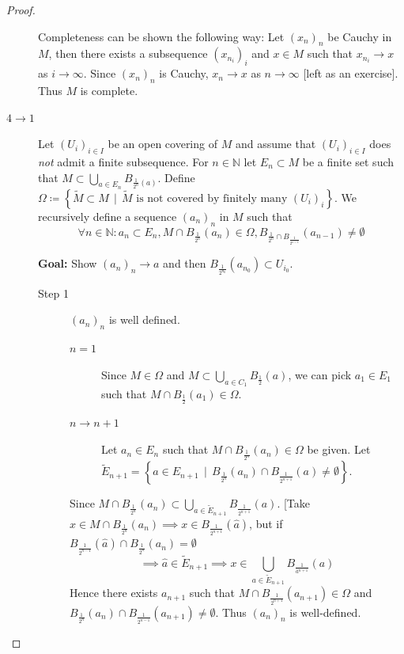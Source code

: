 \documentclass[a4paper]{article}
\numberwithin{lecref}{section}
\newcommand{\SetDef}[2]{\left\{#1\,\mid\,#2\right\}}
\begin{document}
\begin{proof}
\begin{description}
			Completeness can be shown the following way:
			Let $(x_n)_n$ be Cauchy in $M$, then there exists a subsequence $(x_{n_i})_i$ and $x \in M$ such that $x_{n_i} \to x$ as $i \to \infty$.
			Since $(x_n)_n$ is Cauchy, $x_n \to x$ as $n \to \infty$ [left as an exercise]. Thus $M$ is complete.
		\item[$4 \to 1$]
			Let $(U_i)_{i \in I}$ be an open covering of $M$ and assume that $(U_i)_{i \in I}$ does \emph{not} admit a finite subsequence.
			For $n \in \mathbb N$ let $E_n \subset M$ be a finite set such that $M \subset \bigcup_{a \in E_n} B_{\frac1{2^n}(a)}$.
			Define $\Omega \coloneqq \SetDef{\tilde M \subset M}{\tilde M \text{ is not covered by finitely many } (U_i)_i}$.
			We recursively define a sequence $(a_n)_n$ in $M$ such that 
			\[ \forall n \in \mathbb N: a_n \subset E_n, M \cap B_{\frac1{2^n}}(a_n) \in \Omega, B_{\frac{1}{2^n} \cap B_{\frac{1}{2^{n-1}}}}(a_{n-1}) \neq \emptyset \]

			\textbf{Goal:} Show $(a_n)_n \to a$ and then $B_{\frac{1}{2^{n_0}}}(a_{n_0}) \subset U_{i_0}$.

			\begin{description}
				\item[Step 1]
					$(a_n)_n$ is well defined.
					\begin{description}
						\item[$n=1$] Since $M \in \Omega$ and $M \subset \bigcup_{a \in C_1} B_{\frac12}(a)$, we can pick $a_1 \in E_1$ such that $M \cap B_{\frac12}(a_1) \in \Omega$.
						\item[$n \to n+1$]
							Let $a_n \in E_n$ such that $M \cap B_{\frac1{2^n}}(a_n) \in \Omega$ be given.
							Let $\tilde E_{n+1} = \SetDef{a \in E_{n+1}}{B_{\frac1{2^n}}(a_n) \cap B_{\frac1{2^{n+1}}}(a) \neq \emptyset}$.
					\end{description}

					Since $M \cap B_{\frac1{2^n}}(a_n) \subset \bigcup_{a \in \tilde E_{n+1}} B_{\frac{1}{2^{n+1}}}(a)$.
					[Take $x \in M \cap B_{\frac1{2^n}}(a_n) \implies x \in B_{\frac{1}{2^{n+1}}}(\hat a)$, but if $B_{\frac1{2^{n-1}}}(\hat a) \cap B_{\frac1{2^n}}(a_n) = \emptyset$
					\[ \implies \hat a \in \tilde E_{n+1} \implies x \in \bigcup_{a \in \tilde E_{n+1}} B_{\frac{1}{a^{n+1}}}(a) \]
					Hence there exists $a_{n+1}$ such that $M \cap B_{\frac{1}{2^{n+1}}}(a_{n+1}) \in \Omega$ and $B_{\frac{1}{2^n}}(a_n) \cap B_{\frac{1}{2^{n-1}}}(a_{n+1}) \neq \emptyset$.
					Thus $(a_n)_n$ is well-defined.


\end{description}
\end{description}
\end{proof}
\end{document}
